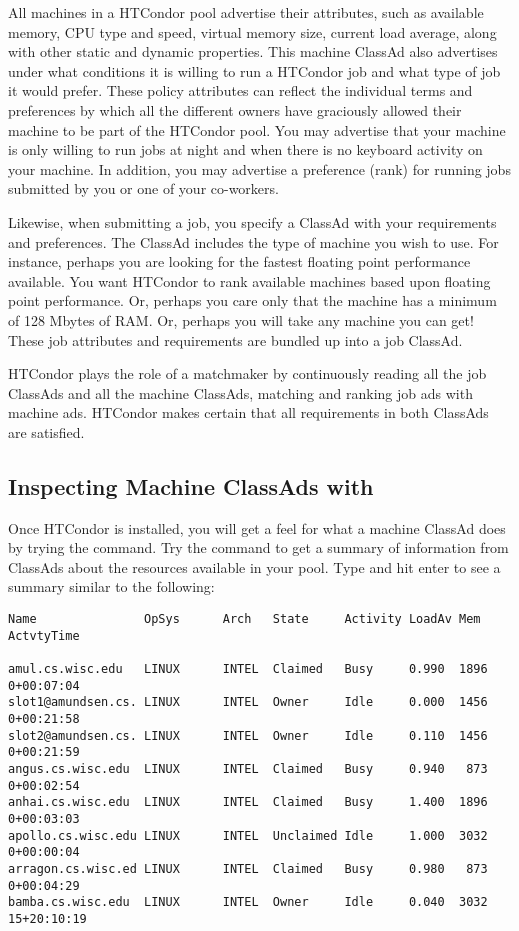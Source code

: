 All machines in a HTCondor pool advertise their attributes,
such as
available memory, CPU type and speed, virtual memory size, current
load average, along with other static and dynamic properties.
This machine ClassAd
also advertises under what conditions it is
willing to run a HTCondor job and what type of job it would prefer. These
policy attributes can reflect the individual terms and preferences by
which all the different owners have graciously allowed their machine to
be part of the HTCondor pool. 
You may
advertise that your machine is only willing to run jobs at night
and when there is no keyboard activity on your machine.
In addition, you may
advertise a preference (rank) for running jobs submitted by you
or one of your co-workers. 

Likewise, when submitting a job, you specify a ClassAd with
your requirements and preferences.
The ClassAd
includes the
type of machine you  wish to use. For instance, perhaps you are
looking for the fastest floating point performance available.
You want HTCondor to rank available machines
based upon floating point performance. Or, perhaps you
care only that the machine has a minimum of 128 Mbytes of RAM.
Or, perhaps you will
take any machine you can get! These job attributes and requirements
are bundled up into a job ClassAd.

HTCondor plays the role of a matchmaker by continuously reading
all the job ClassAds and all the machine ClassAds, 
matching and ranking job ads with machine ads.
HTCondor makes certain that all
requirements in both ClassAds are satisfied. 

\subsection{Inspecting Machine ClassAds with }

Once HTCondor is installed,
you will get a feel for what
a machine ClassAd does by trying
the  command.
Try the  command to get
a summary of information from
ClassAds about the resources available in your pool.
Type  and hit enter to see a summary 
similar to the following:
\footnotesize
\begin{verbatim}
Name               OpSys      Arch   State     Activity LoadAv Mem   ActvtyTime

amul.cs.wisc.edu   LINUX      INTEL  Claimed   Busy     0.990  1896  0+00:07:04
slot1@amundsen.cs. LINUX      INTEL  Owner     Idle     0.000  1456  0+00:21:58
slot2@amundsen.cs. LINUX      INTEL  Owner     Idle     0.110  1456  0+00:21:59
angus.cs.wisc.edu  LINUX      INTEL  Claimed   Busy     0.940   873  0+00:02:54
anhai.cs.wisc.edu  LINUX      INTEL  Claimed   Busy     1.400  1896  0+00:03:03
apollo.cs.wisc.edu LINUX      INTEL  Unclaimed Idle     1.000  3032  0+00:00:04
arragon.cs.wisc.ed LINUX      INTEL  Claimed   Busy     0.980   873  0+00:04:29
bamba.cs.wisc.edu  LINUX      INTEL  Owner     Idle     0.040  3032 15+20:10:19
\end{verbatim}
\normalsize
\Dots 


